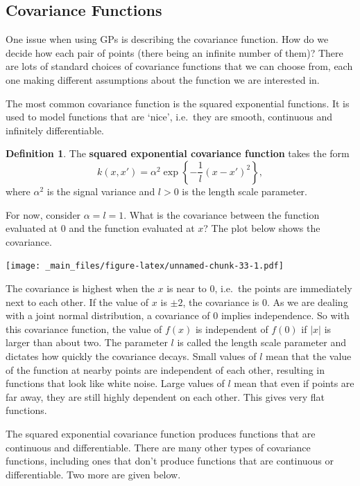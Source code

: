 \documentclass[
]{book}
\theoremstyle{definition}
\newtheorem{definition}{Definition}[chapter]
\theoremstyle{definition}
\theoremstyle{definition}
\theoremstyle{definition}
\theoremstyle{remark}
\begin{document}
\hypertarget{covariance-functions}{%
\subsection{Covariance Functions}\label{covariance-functions}}

One issue when using GPs is describing the covariance function. How do we decide how each pair of points (there being an infinite number of them)? There are lots of standard choices of covariance functions that we can choose from, each one making different assumptions about the function we are interested in.

The most common covariance function is the squared exponential functions. It is used to model functions that are `nice', i.e.~they are smooth, continuous and infinitely differentiable.

\begin{definition}
The \textbf{squared exponential covariance function} takes the form
\[
k(x, x') = \alpha^2\exp\left\{-\frac{1}{l}(x-x')^2\right\},
\]
where \(\alpha^2\) is the signal variance and \(l>0\) is the length scale parameter.
\end{definition}

For now, consider \(\alpha = l = 1\). What is the covariance between the function evaluated at 0 and the function evaluated at \(x\)? The plot below shows the covariance.

\texttt{[image: \_main\_files/figure-latex/unnamed-chunk-33-1.pdf]}

The covariance is highest when the \(x\) is near to 0, i.e.~the points are immediately next to each other. If the value of \(x\) is \(\pm 2\), the covariance is 0. As we are dealing with a joint normal distribution, a covariance of 0 implies independence. So with this covariance function, the value of \(f(x)\) is independent of \(f(0)\) if \(|x|\) is larger than about two. The parameter \(l\) is called the length scale parameter and dictates how quickly the covariance decays. Small values of \(l\) mean that the value of the function at nearby points are independent of each other, resulting in functions that look like white noise. Large values of \(l\) mean that even if points are far away, they are still highly dependent on each other. This gives very flat functions.

The squared exponential covariance function produces functions that are continuous and differentiable. There are many other types of covariance functions, including ones that don't produce functions that are continuous or differentiable. Two more are given below.
\end{document}
